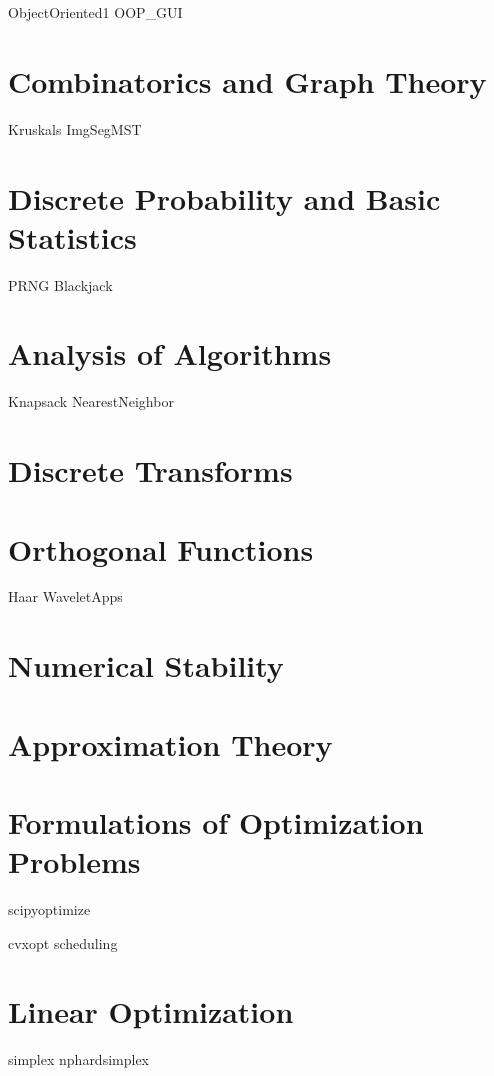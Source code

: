 \documentclass[nociteref]{newsiambook}
\begin{document}
{ObjectOriented1}
{OOP_GUI}

\part{Combinatorics and Graph Theory}
{Kruskals}
{ImgSegMST}

\part{Discrete Probability and Basic Statistics}
{PRNG}
{Blackjack}

\part{Analysis of Algorithms}
{Knapsack}
{NearestNeighbor}

\part{Discrete Transforms}

\part{Orthogonal Functions}
{Haar}
{WaveletApps}

\part{Numerical Stability}

\part{Approximation Theory}

\part{Formulations of Optimization Problems}
{scipyoptimize}

{cvxopt}
{scheduling}

\part{Linear Optimization}
{simplex}
{nphardsimplex}
\end{document}

